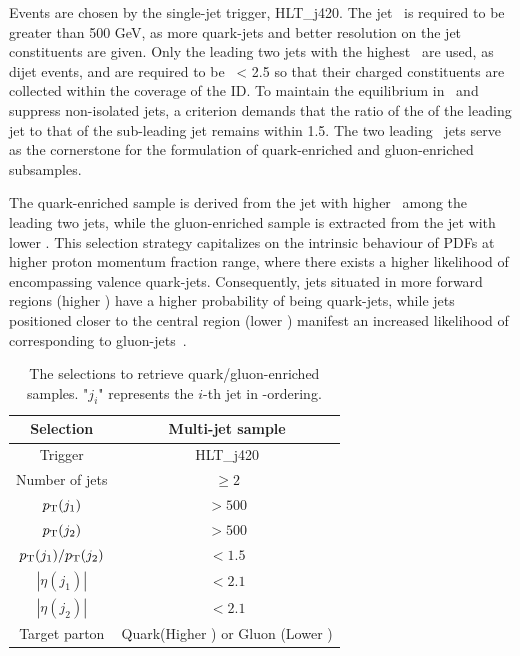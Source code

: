 Events are chosen by the single-jet trigger, HLT\_j420. The jet \pt~is  required to be greater than 500 GeV, as more quark-jets and better resolution on the jet constituents are given. Only the leading two jets with the highest \pt~are used, as dijet events, and are required to be  \abseta~< 2.5 so that their charged constituents are collected within the coverage of the ID. To maintain the equilibrium in \pt~and suppress non-isolated jets, a criterion demands that the ratio of the \pt of the leading jet to that of the sub-leading jet remains within 1.5. The two leading \pt~jets serve as the cornerstone for the formulation of quark-enriched and gluon-enriched subsamples.

The quark-enriched sample is derived from the jet with higher \abseta~among the leading two jets, while the gluon-enriched sample is extracted from the jet with lower \abseta. This selection strategy capitalizes on the intrinsic behaviour of PDFs at higher proton momentum fraction range, where there exists a higher likelihood of encompassing valence quark-jets. Consequently, jets situated in more forward regions (higher \abseta) have a higher probability of being quark-jets, while jets positioned closer to the central region (lower \abseta) manifest an increased likelihood of corresponding to gluon-jets~\cite{ATLAS:2015rlw}.







\begin{table}[htb]
	\centering
	
\begin{tabular}{|c|c|}
	\hline
	Selection & Multi-jet sample  \\ 
	\hline
	 Trigger    & HLT\_j420 \\ 
	 Number of jets         & $\geq2$ \\ 
	 $p_{\mathrm{T}}(j_1)$             & $>500$ \\ 
	 $p_{\mathrm{T}}(j_2)$             & $>500$ \\ 
	 $p_{\mathrm{T}}(j_1)/p_{\mathrm{T}}(j_2)$   & $<1.5$ \\ 
	 $|\eta(j_1)|$         &  $<2.1$   \\ 
	 $|\eta(j_2)|$         &  $<2.1$   \\ \hline
	 Target parton         & Quark(Higher \abseta )  or Gluon (Lower \abseta )       \\
	\hline
\end{tabular}
\caption{
	The selections to retrieve quark/gluon-enriched samples.
	"$j_i$" represents the $i$-th jet in \pt-ordering.
}
\label{tab:QG-sample}
\end{table}


